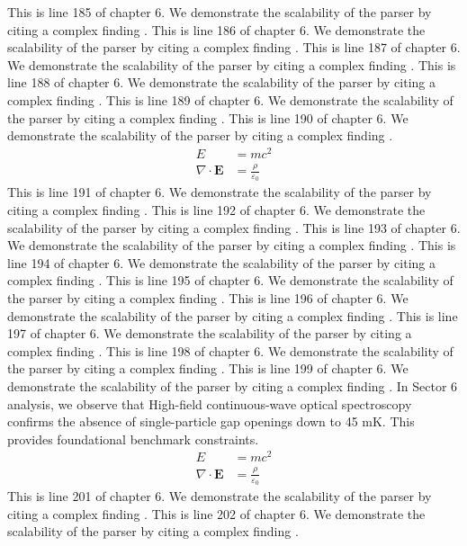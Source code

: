 This is line 185 of chapter 6. We demonstrate the scalability of the parser by citing a complex finding \cite{ref6_185}.
This is line 186 of chapter 6. We demonstrate the scalability of the parser by citing a complex finding \cite{ref6_186}.
This is line 187 of chapter 6. We demonstrate the scalability of the parser by citing a complex finding \cite{ref6_187}.
This is line 188 of chapter 6. We demonstrate the scalability of the parser by citing a complex finding \cite{ref6_188}.
This is line 189 of chapter 6. We demonstrate the scalability of the parser by citing a complex finding \cite{ref6_189}.
This is line 190 of chapter 6. We demonstrate the scalability of the parser by citing a complex finding \cite{ref6_190}.
\begin{align*}
  E &= mc^2 \\
  \nabla \cdot \mathbf{E} &= \frac{\rho}{\varepsilon_0}
\end{align*}
This is line 191 of chapter 6. We demonstrate the scalability of the parser by citing a complex finding \cite{ref6_191}.
This is line 192 of chapter 6. We demonstrate the scalability of the parser by citing a complex finding \cite{ref6_192}.
This is line 193 of chapter 6. We demonstrate the scalability of the parser by citing a complex finding \cite{ref6_193}.
This is line 194 of chapter 6. We demonstrate the scalability of the parser by citing a complex finding \cite{ref6_194}.
This is line 195 of chapter 6. We demonstrate the scalability of the parser by citing a complex finding \cite{ref6_195}.
This is line 196 of chapter 6. We demonstrate the scalability of the parser by citing a complex finding \cite{ref6_196}.
This is line 197 of chapter 6. We demonstrate the scalability of the parser by citing a complex finding \cite{ref6_197}.
This is line 198 of chapter 6. We demonstrate the scalability of the parser by citing a complex finding \cite{ref6_198}.
This is line 199 of chapter 6. We demonstrate the scalability of the parser by citing a complex finding \cite{ref6_199}.
In Sector 6 analysis, we observe that High-field continuous-wave optical spectroscopy confirms the absence of single-particle gap openings down to 45 mK. This provides foundational benchmark constraints.
\begin{align*}
  E &= mc^2 \\
  \nabla \cdot \mathbf{E} &= \frac{\rho}{\varepsilon_0}
\end{align*}
This is line 201 of chapter 6. We demonstrate the scalability of the parser by citing a complex finding \cite{ref6_201}.
This is line 202 of chapter 6. We demonstrate the scalability of the parser by citing a complex finding \cite{ref6_202}.
